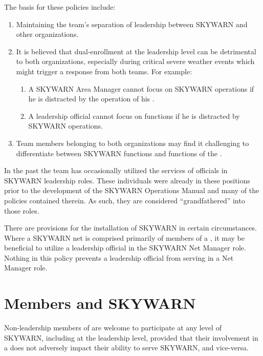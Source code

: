 \documentclass[pdflatex,letterpaper,twoside,12pt]{book}
\begin{document}
The basis for these policies include:

\begin{enumerate}
\item Maintaining the team's separation of leadership between SKYWARN and other organizations.
\item It is believed that dual-enrollment at the leadership level can be detrimental to both organizations, especially during critical severe weather events which might trigger a response from both teams.  For example:
\begin{enumerate}
\item A SKYWARN Area Manager cannot focus on SKYWARN operations if he is distracted by the operation of his \tpteam.
\item A \tpteam leadership official cannot focus on \tpteam functions if he is distracted by SKYWARN operations.
\end{enumerate}
\item Team members belonging to both organizations may find it challenging to differentiate between SKYWARN functions and functions of the \tpteam.
\end{enumerate}

In the past the team has occasionally utilized the services of \tpteam officials in SKYWARN leadership roles.  These individuals were already in these positions prior to the development of the SKYWARN Operations Manual and many of the policies contained therein.  As such, they are considered ``grandfathered'' into those roles.

There are provisions for the installation of SKYWARN  in certain circumstances.  Where a SKYWARN net is comprised primarily of members of a \tpteam, it may be beneficial to utilize a \tpteam leadership official in the SKYWARN Net Manager role.  Nothing in this policy prevents a \tpteam leadership official from serving in a Net Manager role.


\section{\tpteam Members and SKYWARN}

Non-leadership members of \tpteams are welcome to participate at any level of SKYWARN, including at the leadership level, provided that their involvement in a \tpteam does not adversely impact their ability to serve SKYWARN, and vice-versa.
\end{document}
